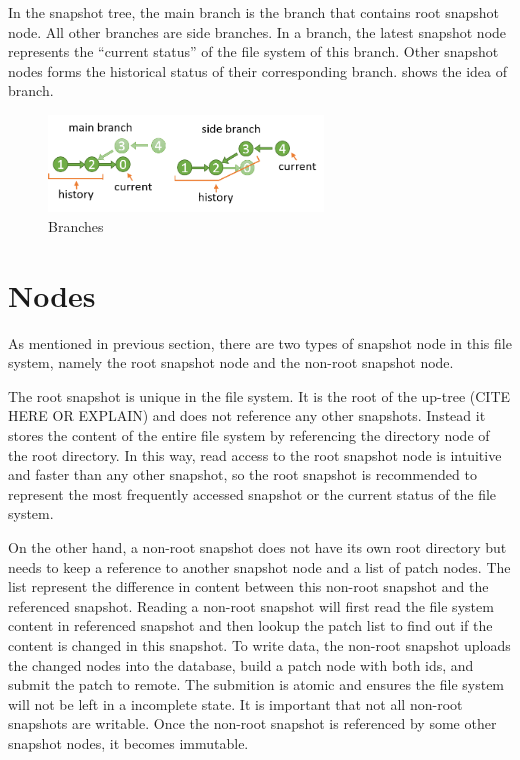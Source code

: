     In the snapshot tree, the main branch is the branch that contains root snapshot node. All other branches are side branches. In a branch, the latest snapshot node represents the “current status” of the file system of this branch. Other snapshot nodes forms the historical status of their corresponding branch.  shows the idea of branch.

\begin{figure}[hbtp]
\centering
\includegraphics[width=0.65\textwidth]{Chapter-4/figs/fig22.png}
\caption{Branches}
\label{fig:branches}
\end{figure}

\section{Nodes}

    As mentioned in previous section, there are two types of snapshot node in this file system, namely the root snapshot node and the non-root snapshot node.

    The root snapshot is unique in the file system. It is the root of the up-tree (CITE HERE OR EXPLAIN) and does not reference any other snapshots. Instead it stores the content of the entire file system by referencing the directory node of the root directory. In this way, read access to the root snapshot node is intuitive and faster than any other snapshot, so the root snapshot is recommended to represent the most frequently accessed snapshot or the current status of the file system.

    On the other hand, a non-root snapshot does not have its own root directory but needs to keep a reference to another snapshot node and a list of patch nodes. The list represent the difference in content between this non-root snapshot and the referenced snapshot. Reading a non-root snapshot will first read the file system content in referenced snapshot and then lookup the patch list to find out if the content is changed in this snapshot. To write data, the non-root snapshot uploads the changed nodes into the database, build a patch node with both ids, and submit the patch to remote. The submition is atomic and ensures the file system will not be left in a incomplete state. It is important that not all non-root snapshots are writable. Once the non-root snapshot is referenced by some other snapshot nodes, it becomes immutable.

